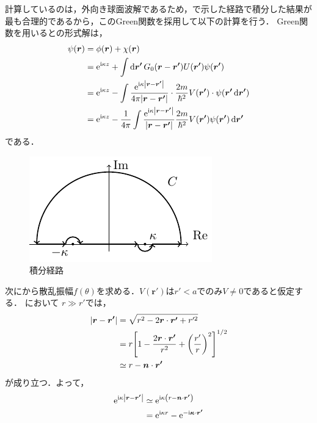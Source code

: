 \documentclass{report}
\begin{document}
    計算しているのは，外向き球面波解であるため，で示した経路で積分した結果が最も合理的であるから，このGreen関数を採用して以下の計算を行う．
    Green関数を用いるとの形式解は，
    \begin{align}
      \psi(\bm{r}) &= \phi(\bm{r}) + \chi(\bm{r}) \\ 
      &= \mathrm{e}^{\mathrm{i}\kappa z} + \int\dd{\bm{r'}} G_0(\bm{r} - \bm{r'}) U(\bm{r'}) \psi(\bm{r'}) \\ 
      &= \mathrm{e}^{\mathrm{i}\kappa z} - \int \frac{\mathrm{e}^{\mathrm{i}\kappa \abs{\bm{r} - \bm{r'}}}}{4\pi \abs{\bm{r} - \bm{r'}}} \cdot \frac{2m}{\hbar^2} V(\bm{r'}) \cdot \psi(\bm{r'}\dd{\bm{r'}}) \\ 
      &= \mathrm{e}^{\mathrm{i}\kappa z} - \frac{1}{4\pi} \int \frac{\mathrm{e}^{\mathrm{i} \kappa \abs{\bm{r} - \bm{r'}}}}{\abs{\bm{r} - \bm{r'}}} \frac{2m}{\hbar^2}V(\bm{r'})\psi(\bm{r'}) \dd{\bm{r'}}\label{formal-soultion}
    \end{align}
    である．
    \begin{figure}[H]
      \centering
      \includegraphics[width = 0.5\columnwidth]{fig/integral-green-tex.pdf}
      \caption{積分経路}\label{Integral}
    \end{figure}
    \par
    次にから散乱振幅$f(\theta)$を求める．$V(\bm{r'})$は$r' < a$でのみ$V\neq 0$であると仮定する．
    において
    $r \gg r'$では，
    \begin{align}
      \abs{\bm{r} - \bm{r'}} &= \sqrt{r^2 - 2\bm{r} \cdot \bm{r'} + r'^2} \\
      &= r \qty[1 - \frac{2\bm{r}\cdot\bm{r'}}{r^2} + \qty(\frac{r'}{r})^2]^{1/2} \\
      &\simeq r - \bm{n}\cdot\bm{r'}\label{abs-r-r-prime-approx}
    \end{align}
    が成り立つ．よって，
    \begin{align}
      \mathrm{e}^{\mathrm{i} \kappa \abs{\bm{r} - \bm{r'}}} &\simeq \mathrm{e}^{\mathrm{i} \kappa \qty(r - \bm{n} \cdot \bm{r'})}\\
      &= \mathrm{e}^{\mathrm{i} \kappa r} - \mathrm{e}^{-\mathrm{i} \bm{\kappa} \cdot \bm{r'}}\label{exp-abs-r-r-prime-approx}
    \end{align}
\end{document}
